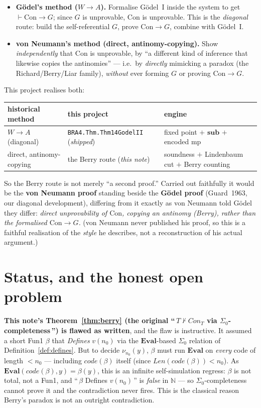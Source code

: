 \documentclass[11pt]{article}
\theoremstyle{plain}
\theoremstyle{definition}
\theoremstyle{remark}
\newcommand{\code}[1]{\mathit{code}(#1)}
\newcommand{\Con}{\mathit{Con}}
\newcommand{\Len}{\mathit{Len}}
\newcommand{\Eval}{\mathbf{Eval}}
\begin{document}
\begin{itemize}
\item \textbf{G\"odel's method ($W \to A$).}  Formalise G\"odel~I inside
the system to get $\vdash \mathrm{Con} \to G$; since $G$ is unprovable,
$\mathrm{Con}$ is unprovable.  This is the \emph{diagonal} route: build
the self-referential $G$, prove $\mathrm{Con}\to G$, combine with
G\"odel~I.

\item \textbf{von Neumann's method (direct, antinomy-copying).}  Show
\emph{independently} that $\mathrm{Con}$ is unprovable, by ``a different
kind of inference that likewise copies the antinomies'' --- i.e.\ by
\emph{directly} mimicking a paradox (the Richard/Berry/Liar family),
\emph{without} ever forming $G$ or proving $\mathrm{Con}\to G$.
\end{itemize}

This project realises both:

\begin{center}
\begin{tabular}{lll}
\hline
historical method & this project & engine \\
\hline
$W \to A$ (diagonal) & \texttt{BRA4.Thm.Thm14GodelII} (\emph{shipped}) & fixed point $+$ $\mathbf{sub}$ $+$ encoded mp \\
direct, antinomy-copying & the Berry route (\emph{this note}) & soundness $+$ Lindenbaum cut $+$ Berry counting \\
\hline
\end{tabular}
\end{center}

So the Berry route is not merely ``a second proof.''  Carried out
faithfully it would be the \textbf{von Neumann proof} standing beside
the \textbf{G\"odel proof} (Guard~1963, our diagonal development),
differing from it exactly as von Neumann told G\"odel they differ:
\emph{direct unprovability of $\mathrm{Con}$, copying an antinomy
(Berry), rather than the formalised $\mathrm{Con}\to G$.}  (von Neumann
never published his proof, so this is a faithful realisation of the
\emph{style} he describes, not a reconstruction of his actual argument.)

\section{Status, and the honest open problem}
\label{sec:status}

\textbf{This note's Theorem~\ref{thm:berry} (the original
``\,$T \not\vdash \Con_T$ via $\Sigma_0$-completeness\,'') is flawed as
written}, and the flaw is instructive.  It assumed a short Fun1
$\beta$ that \emph{Defines} $v(n_0)$ via the $\Eval$-based $\Sigma_0$
relation of Definition~\ref{def:defines}.  But to decide
$\nu_{n_0}(y)$, $\beta$ must run $\Eval$ on \emph{every} code of length
$< n_0$ --- including $\code{\beta}$ itself (since $\Len(\code\beta) <
n_0$).  As $\Eval(\code\beta, y) = \beta(y)$, this is an infinite
self-simulation regress: $\beta$ is not total, not a Fun1, and
``\,$\beta$ Defines $v(n_0)$\,'' is \emph{false} in $\mathbb{N}$ --- so
$\Sigma_0$-completeness cannot prove it and the contradiction never
fires.  This is the classical reason Berry's paradox is not an
outright contradiction.
\end{document}
